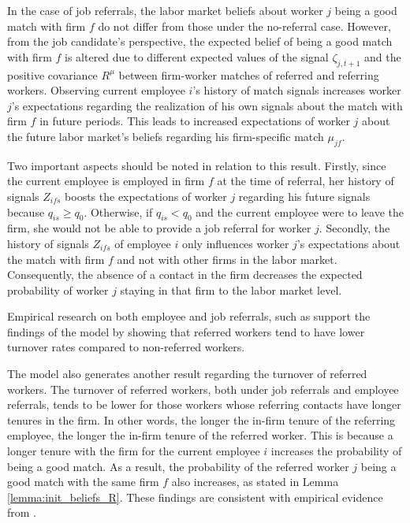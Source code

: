 \documentclass[12pt]{article}
\begin{document}
In the case of job referrals, the labor market beliefs about worker $j$ being a good match with firm $f$ do not differ from those under the no-referral case. However, from the job candidate's perspective, the expected belief of being a good match with firm $f$ is altered due to different expected values of the signal $\zeta_{j,t+1}$ and the positive covariance $R^{\mu}$ between firm-worker matches of referred and referring workers. Observing current employee $i$'s history of match signals increases worker $j$'s expectations regarding the realization of his own signals about the match with firm $f$ in future periods. This leads to increased expectations of worker $j$ about the future labor market's beliefs regarding his firm-specific match $\mu_{jf}$.

Two important aspects should be noted in relation to this result. Firstly, since the current employee is employed in firm $f$ at the time of referral, her history of signals $Z_{ifs}$ boosts the expectations of worker $j$ regarding his future signals because $q_{is} \geq q_0$. Otherwise, if $q_{is} < q_0$ and the current employee were to leave the firm, she would not be able to provide a job referral for worker $j$. Secondly, the history of signals $Z_{ifs}$ of employee $i$ only influences worker $j$'s expectations about the match with firm $f$ and not with other firms in the labor market. Consequently, the absence of a contact in the firm decreases the expected probability of worker $j$ staying in that firm to the labor market level.

Empirical research on both employee and job referrals, such as \cite{datcher1983impact, simon1992matchmaker, galenianos2013learning, burks2015value, heath2018firms} support the findings of the model by showing that referred workers tend to have lower turnover rates compared to non-referred workers.

The model also generates another result regarding the turnover of referred workers. The turnover of referred workers, both under job referrals and employee referrals, tends to be lower for those workers whose referring contacts have longer tenures in the firm. In other words, the longer the in-firm tenure of the referring employee, the longer the in-firm tenure of the referred worker. This is because a longer tenure with the firm for the current employee $i$ increases the probability of being a good match. As a result, the probability of the referred worker $j$ being a good match with the same firm $f$ also increases, as stated in Lemma \ref{lemma:init_beliefs_R}. These findings are consistent with empirical evidence from  \cite{pallais2016referential, lalanne2016old, levati2020impact}.
\end{document}
